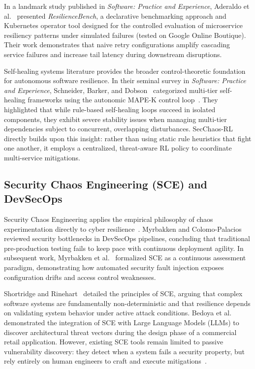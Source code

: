 \documentclass[ASNA,twocolumn]{USG}
\begin{document}
In a landmark study published in \textit{Software: Practice and Experience}, Aderaldo et al.~\cite{aderaldo2025declarative} presented \textit{ResilienceBench}, a declarative benchmarking approach and Kubernetes operator tool designed for the controlled evaluation of microservice resiliency patterns under simulated failures (tested on Google Online Boutique). Their work demonstrates that naive retry configurations amplify cascading service failures and increase tail latency during downstream disruptions.

Self-healing systems literature provides the broader control-theoretic foundation for autonomous software resilience. In their seminal survey in \textit{Software: Practice and Experience}, Schneider, Barker, and Dobson~\cite{schneider2015survey} categorized multi-tier self-healing frameworks using the autonomic MAPE-K control loop~\cite{garlan2004rainbow, salehie2009self}. They highlighted that while rule-based self-healing loops succeed in isolated components, they exhibit severe stability issues when managing multi-tier dependencies subject to concurrent, overlapping disturbances. SecChaos-RL directly builds upon this insight: rather than using static rule heuristics that fight one another, it employs a centralized, threat-aware RL policy to coordinate multi-service mitigations.

\subsection{Security Chaos Engineering (SCE) and DevSecOps}
Security Chaos Engineering applies the empirical philosophy of chaos experimentation directly to cyber resilience~\cite{shortridge2023security}. Myrbakken and Colomo-Palacios~\cite{myrbakken2020security} reviewed security bottlenecks in DevSecOps pipelines, concluding that traditional pre-production testing fails to keep pace with continuous deployment agility. In subsequent work, Myrbakken et al.~\cite{myrbakken2021security} formalized SCE as a continuous assessment paradigm, demonstrating how automated security fault injection exposes configuration drifts and access control weaknesses.

Shortridge and Rinehart~\cite{shortridge2023security} detailed the principles of SCE, arguing that complex software systems are fundamentally non-deterministic and that resilience depends on validating system behavior under active attack conditions. Bedoya et al.~\cite{bedoya2024enhancing} demonstrated the integration of SCE with Large Language Models (LLMs) to discover architectural threat vectors during the design phase of a commercial retail application. However, existing SCE tools remain limited to passive vulnerability discovery: they detect when a system fails a security property, but rely entirely on human engineers to craft and execute mitigations~\cite{shortridge2023security, owotogbe2025chaos}.
\end{document}
